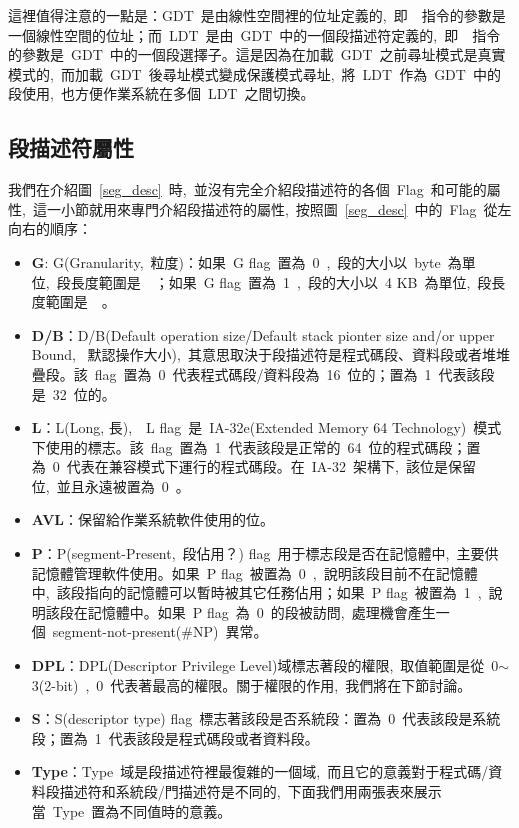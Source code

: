 這裡值得注意的一點是：GDT~是由線性空間裡的位址定義的,~即~~指令的參數是一個線性空間的位址；而~LDT~是由~GDT~中的一個段描述符定義的,~即~~指令的參數是~GDT~中的一個段選擇子。這是因為在加載~GDT~之前尋址模式是真實模式的,~而加載~GDT~後尋址模式變成保護模式尋址,~將~LDT~作為~GDT~中的段使用,~也方便作業系統在多個~LDT~之間切換。

\subsection{段描述符屬性} \label{CHpm_desattr}

我們在介紹圖~\ref{seg_desc}~時,~並沒有完全介紹段描述符的各個~Flag~和可能的屬性,~這一小節就用來專門介紹段描述符的屬性,~按照圖~\ref{seg_desc}~中的~Flag~從左向右的順序：

\begin{itemize}
\item{\textbf{G}}: G(Granularity,~粒度)：如果~G flag~置為~0~,~段的大小以~byte~為單位,~段長度範圍是~~；如果~G flag~置為~1~,~段的大小以~4 KB~為單位,~段長度範圍是~~。
\item{\textbf{D/B}}：D/B(Default operation size/Default stack pionter size and/or upper Bound,~ 默認操作大小),~其意思取決于段描述符是程式碼段、資料段或者堆堆疊段。該~flag~置為~0~代表程式碼段/資料段為~16~位的；置為~1~代表該段是~32~位的。
\item{\textbf{L}}：L(Long, 長),~~L flag~是~IA-32e(Extended Memory 64 Technology)~模式下使用的標志。該~flag~置為~1~代表該段是正常的~64~位的程式碼段；置為~0~代表在兼容模式下運行的程式碼段。在~IA-32~架構下,~該位是保留位,~並且永遠被置為~0~。
\item{\textbf{AVL}}：保留給作業系統軟件使用的位。
\item{\textbf{P}}：P(segment-Present,~段佔用？) flag~用于標志段是否在記憶體中,~主要供記憶體管理軟件使用。如果~P flag~被置為~0~,~說明該段目前不在記憶體中,~該段指向的記憶體可以暫時被其它任務佔用；如果~P flag~被置為~1~,~說明該段在記憶體中。如果~P flag~為~0~的段被訪問,~處理機會產生一個~segment-not-present(\#NP)~異常。
\item{\textbf{DPL}}：DPL(Descriptor Privilege Level)域標志著段的權限,~取值範圍是從~0$\sim$3(2-bit)~,~0~代表著最高的權限。關于權限的作用,~我們將在下節討論。
\item{\textbf{S}}：S(descriptor type) flag~標志著該段是否系統段：置為~0~代表該段是系統段；置為~1~代表該段是程式碼段或者資料段。
\item{\textbf{Type}}：Type~域是段描述符裡最復雜的一個域,~而且它的意義對于程式碼/資料段描述符和系統段/門描述符是不同的,~下面我們用兩張表來展示當~Type~置為不同值時的意義。


\end{itemize}
